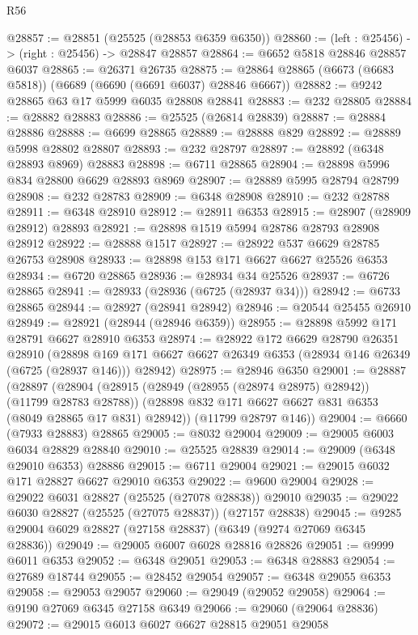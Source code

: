 \begin{lexlean}{R56}
\begin{coremodule}
@28857 := @28851 (@25525 (@28853 @6359 @6350))
@28860 := (left : @25456) -> (right : @25456) -> @28847 @28857
@28864 := @6652 @5818 @28846 @28857 @6037
@28865 := @26371 @26735
@28875 := @28864 @28865 (@6673 (@6683 @5818)) (@6689 (@6690 (@6691 @6037) @28846 @6667))
@28882 := @9242 @28865 @63 @17 @5999 @6035 @28808 @28841
@28883 := @232 @28805
@28884 := @28882 @28883
@28886 := @25525 (@26814 @28839)
@28887 := @28884 @28886
@28888 := @6699 @28865
@28889 := @28888 @829
@28892 := @28889 @5998 @28802 @28807
@28893 := @232 @28797
@28897 := @28892 (@6348 @28893 @8969) @28883
@28898 := @6711 @28865
@28904 := @28898 @5996 @834 @28800 @6629 @28893 @8969
@28907 := @28889 @5995 @28794 @28799
@28908 := @232 @28783
@28909 := @6348 @28908
@28910 := @232 @28788
@28911 := @6348 @28910
@28912 := @28911 @6353
@28915 := @28907 (@28909 @28912) @28893
@28921 := @28898 @1519 @5994 @28786 @28793 @28908 @28912
@28922 := @28888 @1517
@28927 := @28922 @537 @6629 @28785 @26753 @28908
@28933 := @28898 @153 @171 @6627 @6627 @25526 @6353
@28934 := @6720 @28865
@28936 := @28934 @34 @25526
@28937 := @6726 @28865
@28941 := @28933 (@28936 (@6725 (@28937 @34)))
@28942 := @6733 @28865
@28944 := @28927 (@28941 @28942)
@28946 := @20544 @25455 @26910
@28949 := @28921 (@28944 (@28946 @6359))
@28955 := @28898 @5992 @171 @28791 @6627 @28910 @6353
@28974 := @28922
    @172
    @6629
    @28790
    @26351
    @28910
    (@28898 @169 @171 @6627 @6627 @26349 @6353 (@28934 @146 @26349 (@6725 (@28937 @146))) @28942)
@28975 := @28946 @6350
@29001 := @28887
    (@28897
      (@28904
        (@28915 (@28949 (@28955 (@28974 @28975) @28942)) (@11799 @28783 @28788))
        (@28898 @832 @171 @6627 @6627 @831 @6353 (@8049 @28865 @17 @831) @28942))
      (@11799 @28797 @146))
@29004 := @6660 (@7933 @28883) @28865
@29005 := @8032 @29004
@29009 := @29005 @6003 @6034 @28829 @28840
@29010 := @25525 @28839
@29014 := @29009 (@6348 @29010 @6353) @28886
@29015 := @6711 @29004
@29021 := @29015 @6032 @171 @28827 @6627 @29010 @6353
@29022 := @9600 @29004
@29028 := @29022 @6031 @28827 (@25525 (@27078 @28838)) @29010
@29035 := @29022 @6030 @28827 (@25525 (@27075 @28837)) (@27157 @28838)
@29045 := @9285 @29004 @6029 @28827 (@27158 @28837) (@6349 (@9274 @27069 @6345 @28836))
@29049 := @29005 @6007 @6028 @28816 @28826
@29051 := @9999 @6011 @6353
@29052 := @6348 @29051
@29053 := @6348 @28883
@29054 := @27689 @18744
@29055 := @28452 @29054
@29057 := @6348 @29055 @6353
@29058 := @29053 @29057
@29060 := @29049 (@29052 @29058)
@29064 := @9190 @27069 @6345 @27158 @6349
@29066 := @29060 (@29064 @28836)
@29072 := @29015 @6013 @6027 @6627 @28815 @29051 @29058

\end{coremodule}
\end{lexlean}
